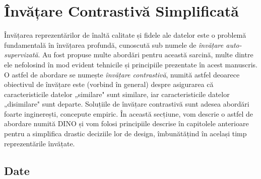 \documentclass[../../book-main_ro.tex]{subfiles}
\begin{document}
\section{Învățare Contrastivă Simplificată}\label{sec:contrastive_learning}

Învățarea reprezentărilor de înaltă calitate și fidele ale datelor este o problemă fundamentală în învățarea profundă, cunoscută sub numele de \textit{învățare auto-supervizată}. Au fost propuse multe abordări pentru această sarcină, multe dintre ele nefolosind în mod evident tehnicile și principiile prezentate în acest manuscris. O astfel de abordare se numește \textit{învățare contrastivă}, numită astfel deoarece obiectivul de învățare este (vorbind în general) despre asigurarea că caracteristicile datelor „similare" sunt similare, iar caracteristicile datelor „disimilare" sunt departe. Soluțiile de învățare contrastivă sunt adesea abordări foarte inginerești, concepute empiric. În această secțiune, vom descrie o astfel de abordare numită DINO \citep{caron2021emerging} și vom folosi principiile descrise în capitolele anterioare pentru a simplifica drastic deciziile lor de design, îmbunătățind în același timp reprezentările învățate.

\subsection{Date}\label{sub:contrastive_learning_data}
\end{document}
